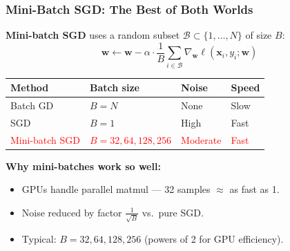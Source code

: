 \documentclass[notes,11pt, aspectratio=169]{beamer}
\newcommand{\vx}{\mathbf{x}}
\newcommand{\vw}{\mathbf{w}}
\begin{document}
\begin{frame}
\frametitle{Mini-Batch SGD: The Best of Both Worlds}

\textbf{Mini-batch SGD} uses a random subset $\mathcal{B} \subset \{1, \ldots, N\}$ of size $B$:
\[
    \vw \leftarrow \vw - \alpha \cdot \frac{1}{B}\sum_{i \in \mathcal{B}} \nabla_{\vw}\ell(\vx_i, y_i; \vw)
\]

\vspace{6pt}
\renewcommand{\arraystretch}{1.4}
\begin{center}
\begin{tabular}{llll}
\toprule
\textbf{Method} & \textbf{Batch size} & \textbf{Noise} & \textbf{Speed} \\
\midrule
Batch GD & $B = N$ & None & Slow \\
SGD & $B = 1$ & High & Fast \\
\textcolor{red}{Mini-batch SGD} & \textcolor{red}{$B = 32, 64, 128, 256$} & \textcolor{red}{Moderate} & \textcolor{red}{Fast} \\
\bottomrule
\end{tabular}
\end{center}

\vspace{2pt}
\textbf{Why mini-batches work so well:}
\begin{itemize}
    \item GPUs handle parallel matmul --- 32 samples $\approx$ as fast as 1.
    \item Noise reduced by factor $\frac{1}{\sqrt{B}}$ vs.\ pure SGD.
    \item Typical: $B = 32, 64, 128, 256$ (powers of 2 for GPU efficiency).
\end{itemize}
\end{frame}
\end{document}
